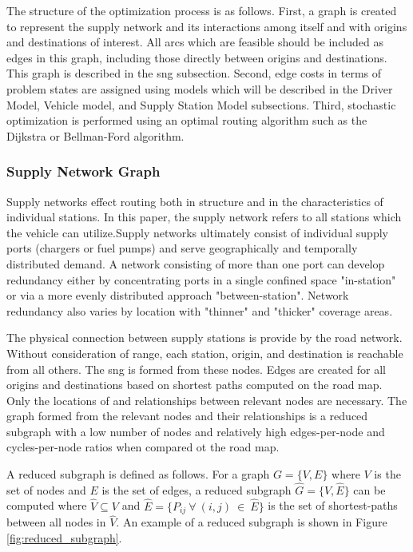 \documentclass[11pt]{article}
\begin{document}
\begin{multicols}{2}
The structure of the optimization process is as follows. First, a graph is created to represent the supply network and its interactions among itself and with origins and destinations of interest. All arcs which are feasible should be included as edges in this graph, including those directly between origins and destinations. This graph is described in the \gls{sng} subsection. Second, edge costs in terms of problem states are assigned using models which will be described in the Driver Model, Vehicle model, and Supply Station Model subsections. Third, stochastic optimization is performed using an optimal routing algorithm such as the Dijkstra or Bellman-Ford algorithm.

\subsubsection*{Supply Network Graph}

Supply networks effect routing both in structure and in the characteristics of individual stations. In this paper, the supply network refers to all stations which the vehicle can utilize.Supply networks ultimately consist of individual supply ports (chargers or fuel pumps) and serve geographically and temporally distributed demand. A network consisting of more than one port can develop redundancy either by concentrating ports in a single confined space "in-station" or via a more evenly distributed approach "between-station". Network redundancy also varies by location with "thinner" and "thicker" coverage areas.

The physical connection between supply stations is provide by the road network. Without consideration of range, each station, origin, and destination is reachable from all others. The \gls{sng} is formed from these nodes. Edges are created for all origins and destinations based on shortest paths computed on the road map. Only the locations of and relationships between relevant nodes are necessary. The graph formed from the relevant nodes and their relationships is a reduced subgraph with a low number of nodes and relatively high edges-per-node and cycles-per-node ratios when compared ot the road map.

A reduced subgraph is defined as follows. For a graph $G = \{V, E\}$ where $V$ is the set of nodes and $E$ is the set of edges, a reduced subgraph $\hat{G} = \{\hat{V}, \hat{E}\}$ can be computed where $\hat{V} \subseteq V$ and $\hat{E} = \{P_{ij}\ \forall\ (i, j)\ \in\ \hat{E}\}$ is the set of shortest-paths between all nodes in $\hat{V}$. An example of a reduced subgraph is shown in Figure \ref{fig:reduced_subgraph}.


\end{multicols}
\end{document}
